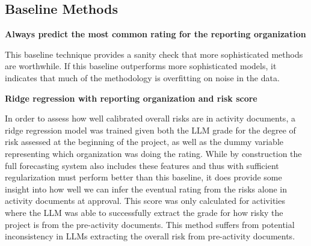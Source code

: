 \subsection{Baseline Methods} \label{sub:baselines}

\textbf{Always predict the most common rating for the reporting organization}

This baseline technique provides a sanity check that more sophisticated methods are worthwhile. If this baseline outperforms more sophisticated models, it indicates that much of the methodology is overfitting on noise in the data.


\textbf{Ridge regression with reporting organization and risk score}

In order to assess how well calibrated overall risks are in activity documents, a ridge regression model was trained given both the LLM grade for the degree of risk assessed at the beginning of the project, as well as the dummy variable representing which organization was doing the rating. While by construction the full forecasting system also includes these features and thus with sufficient regularization must perform better than this baseline, it does provide some insight into how well we can infer the eventual rating from the risks alone in activity documents at approval. This score was only calculated for activities where the LLM was able to successfully extract the grade for how risky the project is from the pre-activity documents. This method suffers from potential inconsistency in LLMs extracting the overall risk from pre-activity documents.

